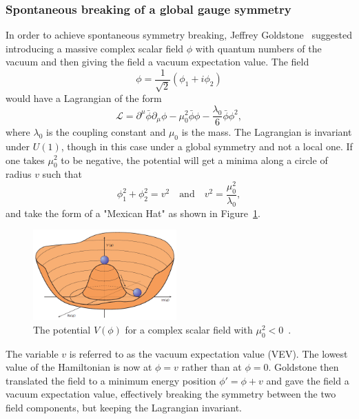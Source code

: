 \subsubsection{Spontaneous breaking of a global gauge symmetry}
In order to achieve spontaneous symmetry breaking, Jeffrey Goldstone~\cite{Goldstone:1961eq} suggested introducing a massive complex scalar field $\phi$ with quantum numbers of the vacuum and then giving the field a vacuum expectation value. The field
\begin{equation}
\phi = \frac{1}{\sqrt{2}}(\phi_1+i\phi_2)  
\end{equation}
would have a Lagrangian of the form
\begin{equation}
\mathcal{L} = \partial^{\mu}\bar{\phi}\partial_{\mu}\phi-\mu_0^2\bar{\phi}\phi-\frac{\lambda_0}{6}\bar{\phi}\phi^2,
\end{equation}
where $\lambda_0$ is the coupling constant and $\mu_0$ is the mass. The Lagrangian is invariant under $U(1)$, though in this case under a global symmetry and not a local one. If one takes $\mu_0^2$ to be negative, the potential will get a minima along a circle of radius $v$ such that
\begin{equation}
  \phi_1^2+\phi_2^2 = v^2 \quad \textrm{and}\quad v^2=\frac{\mu_0^2}{\lambda_0},
\end{equation}
and take the form of a "Mexican Hat" as shown in Figure~\ref{fig:theory:higgspot}. 
  \begin{figure}[h!]
  \centering
  \includegraphics[width=0.49\textwidth]{figures/theory/higgspotential.png}
  \caption{The potential $V(\phi)$ for a complex scalar field with $\mu_0^2<0$~\cite{Ellis:1638469}.}
  \label{fig:theory:higgspot}
  \end{figure}
The variable $v$ is referred to as the vacuum expectation value (VEV). The lowest value of the Hamiltonian is now at $\phi=v$ rather than at $\phi=0$. Goldstone then translated the field to a minimum energy position $\phi'=\phi+v$ and gave the field a vacuum expectation value, effectively breaking the symmetry between the two field components, but keeping the Lagrangian invariant.
